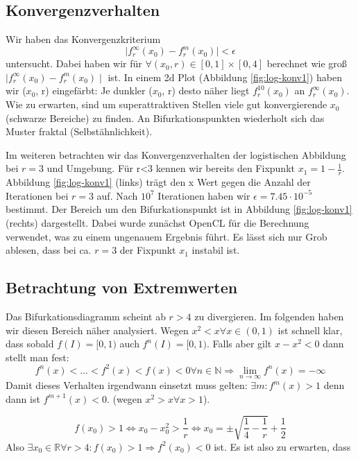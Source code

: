 \documentclass{scrartcl}
\begin{document}
\subsection{Konvergenzverhalten}
Wir haben das Konvergenzkriterium 
\begin{equation}
\mid f^{\infty}_r(x_0)-f^{m}_r(x_0)\mid < \epsilon
\end{equation}
untersucht. Dabei haben wir für $\forall (x_0, r) \in [0,1] \times [0,4]$  berechnet wie groß $\mid f^{\infty}_r(x_0)-f^{m}_r(x_0)\mid $ ist. 
In einem 2d Plot (Abbildung \ref{fig:log-konv1}) haben wir ($x_0$, r) eingefärbt: Je dunkler ($x_0$, r) desto näher liegt $f^{10}_r(x_0)$ an $f^{\infty}_r(x_0)$. Wie zu erwarten, sind um superattraktiven Stellen viele gut konvergierende $x_0$ (schwarze Bereiche) zu finden. An Bifurkationspunkten wiederholt sich das Muster fraktal (Selbstähnlichkeit). 

Im weiteren betrachten wir das Konvergenzverhalten der logistischen Abbildung bei $r=3$ und Umgebung. Für r<3 kennen wir bereits den Fixpunkt $x_1=1-\frac{1}{r}$. 
Abbildung \ref{fig:log-konv1} (links) trägt den x Wert gegen die Anzahl der Iterationen bei $r=3$ auf. Nach $10^7$ Iterationen haben wir $\epsilon=7.45 \cdot 10^{-5}$ bestimmt.
Der Bereich um den Bifurkationspunkt ist in Abbildung \ref{fig:log-konv1} (rechts) dargestellt. Dabei wurde zunächst OpenCL für die Berechnung verwendet, was zu einem ungenauem Ergebnis führt. Es lässt sich nur Grob ablesen, dass bei ca. $r=3$ der Fixpunkt $x_1$ instabil ist.

\subsection{Betrachtung von Extremwerten}
Das Bifurkationsdiagramm scheint ab $r>4$ zu divergieren. Im folgenden haben wir diesen Bereich näher analysiert. 
Wegen  $x^2 < x \forall x \in (0,1)$ ist schnell klar, dass sobald $f(I) = [0,1)$ auch $f^n(I) = [0, 1)$. 
Falls aber gilt $x-x^2 < 0$ dann stellt man fest:
\begin{equation}
f^n(x) < ... < f^{2}(x) < f(x) < 0 \forall n \in \mathbb{N} \Rightarrow \lim_{n \rightarrow \infty} f^n(x) = -\infty
\end{equation}
Damit dieses Verhalten irgendwann einsetzt muss gelten: $\exists m: f^m(x) > 1$ denn dann ist $f^{m+1}(x) < 0.$ (wegen $x^2 > x \forall x > 1$). 

\begin{equation}
f(x_0) > 1 \iff x_0-x_0^2 > \frac{1}{r} \iff x_0 = \pm \sqrt{\frac{1}{4}-\frac{1}{r}} + \frac{1}{2}
\end{equation}
Also $\exists x_0 \in \mathbb{R} \forall r > 4: f(x_0) > 1 \Rightarrow f^2(x_0) < 0$ ist. Es ist also zu erwarten, dass 
\end{document}
